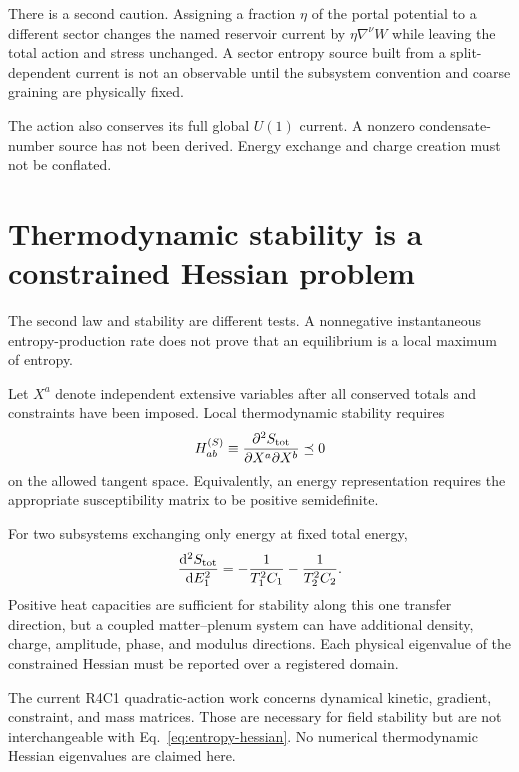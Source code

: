 \documentclass[aps,prd,reprint,superscriptaddress,nofootinbib,floatfix]{revtex4-2}
\newcommand{\dd}{\mathrm{d}}
\begin{document}
There is a second caution.  Assigning a fraction \(\eta\) of the portal
potential to a different sector changes the named reservoir current by
\(\eta\nabla^\nu W\) while leaving the total action and stress unchanged.
A sector entropy source built from a split-dependent current is not an
observable until the subsystem convention and coarse graining are physically
fixed.

The action also conserves its full global \(U(1)\) current.  A nonzero
condensate-number source has not been derived.  Energy exchange and charge
creation must not be conflated.

\section{Thermodynamic stability is a constrained Hessian problem}
\label{sec:stability}

The second law and stability are different tests.  A nonnegative instantaneous
entropy-production rate does not prove that an equilibrium is a local maximum
of entropy.

Let \(X^a\) denote independent extensive variables after all conserved totals
and constraints have been imposed.  Local thermodynamic stability requires
\begin{equation}
 H^{(S)}_{ab}
 \equiv
 \frac{\partial^2S_{\rm tot}}{\partial X^a\partial X^b}
 \preceq0
 \label{eq:entropy-hessian}
\end{equation}
on the allowed tangent space.  Equivalently, an energy representation requires
the appropriate susceptibility matrix to be positive semidefinite.

For two subsystems exchanging only energy at fixed total energy,
\begin{equation}
 \frac{\dd^2 S_{\rm tot}}{\dd E_1^2}
 =-\frac{1}{T_1^2C_1}
  -\frac{1}{T_2^2C_2}.
 \label{eq:heat-capacity}
\end{equation}
Positive heat capacities are sufficient for stability along this one transfer
direction, but a coupled matter--plenum system can have additional density,
charge, amplitude, phase, and modulus directions.  Each physical eigenvalue of
the constrained Hessian must be reported over a registered domain.

The current R4C1 quadratic-action work concerns dynamical kinetic, gradient,
constraint, and mass matrices.  Those are necessary for field stability but
are not interchangeable with Eq.~\eqref{eq:entropy-hessian}.  No numerical
thermodynamic Hessian eigenvalues are claimed here.
\end{document}
